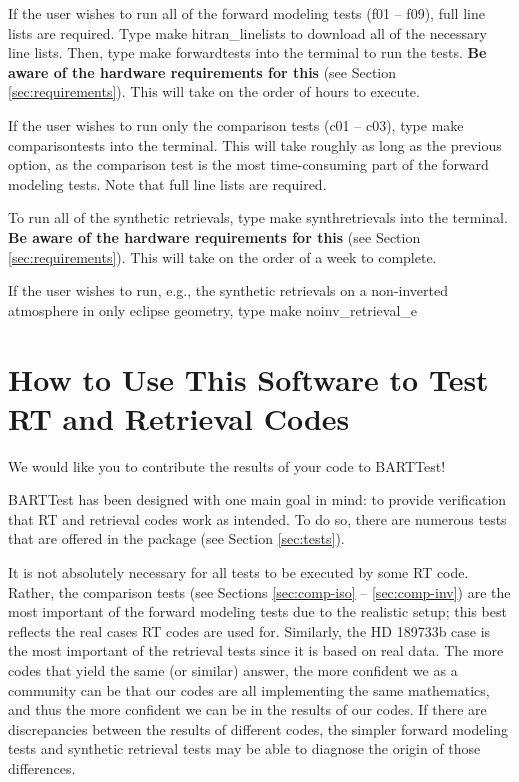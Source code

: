 \documentclass[letterpaper, 12pt]{article}
\begin{document}
If the user wishes to run all of the forward modeling tests (f01 -- f09), full line lists are required.
Type
\beginverbatim
make hitran_linelists
\endverbatim
to download all of the necessary line lists. Then, type
\beginverbatim
make forwardtests
\endverbatim
into the terminal to run the tests. \textbf{Be aware of the hardware requirements for this} 
(see Section \ref{sec:requirements}). This will take on the order of hours 
to execute.

If the user wishes to run only the comparison tests (c01 -- c03), type
\beginverbatim
make comparisontests
\endverbatim
into the terminal. This will take roughly as long as the previous option, as 
the comparison test is the most time-consuming part of the forward modeling 
tests. Note that full line lists are required.

To run all of the synthetic retrievals, type
\beginverbatim
make synthretrievals
\endverbatim
into the terminal. \textbf{Be aware of the hardware requirements for this} 
(see Section \ref{sec:requirements}). This will take on the order of a week to complete.

If the user wishes to run, e.g., the synthetic retrievals on a non-inverted 
atmosphere in only eclipse geometry, type
\beginverbatim
make noinv_retrieval_e
\endverbatim

\section{How to Use This Software to Test RT and Retrieval Codes}
\label{sec:howto}
We would like you to contribute the results of your code to BARTTest! 

BARTTest has been designed with one main goal in mind: to provide verification 
that RT and retrieval codes work as intended. To do so, there are numerous 
tests that are offered in the package (see Section \ref{sec:tests}).

It is not absolutely necessary for all tests to be executed by some RT code. 
Rather, the comparison tests (see Sections \ref{sec:comp-iso} -- \ref{sec:comp-inv}) are the most important 
of the forward modeling tests due to the realistic setup; this best reflects 
the real cases RT codes are used for. Similarly, the HD 189733b case is the most 
important of the retrieval tests since it is based on real data. The more 
codes that yield the same (or similar) answer, the more confident we as a 
community can be that our codes are all implementing the same mathematics, 
and thus the more confident we can be in the results of our codes. If there 
are discrepancies between the results of different codes, the simpler forward 
modeling tests and synthetic retrieval tests may be able to diagnose the origin 
of those differences.
\end{document}
